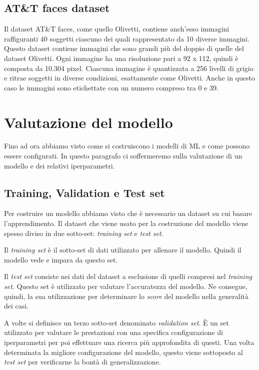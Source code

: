 \documentclass[12pt,italian]{report}
\begin{document}
\subsection{AT\&T faces dataset}
Il dataset AT\&T faces, come quello Olivetti, contiene anch'esso immagini raffiguranti 40 soggetti ciascuno dei quali rappresentato da 10 diverse immagini. Questo dataset contiene immagini che sono grandi più del doppio di quelle del dataset Olivetti. Ogni immagine ha una risoluzione pari a 92 x 112, quindi è composta da 10.304 pixel. Ciascuna immagine è quantizzata a 256 livelli di grigio e ritrae soggetti in diverse condizioni, esattamente come Olivetti. Anche in questo caso le immagini sono etichettate con un numero compreso tra 0 e 39.

\section{Valutazione del modello}
Fino ad ora abbiamo visto come si costruiscono i modelli di ML e come possono essere configurati. In questo paragrafo ci soffermeremo sulla valutazione di un modello e dei relativi iperparametri.

\subsection{Training, Validation e Test set}
Per costruire un modello abbiamo visto che è necessario un dataset su cui basare l'apprendimento. Il dataset che viene usato per la costruzione del modello viene spesso diviso in due sotto-set: \emph{training set} e \emph{test set}.

Il \emph{training set} è il sotto-set di dati utilizzato per allenare il modello. Quindi il modello vede e impara da questo set.

Il \emph{test set} consiste nei dati del dataset a esclusione di quelli compresi nel \emph{training set}. Questo set è utilizzato per valutare l'accuratezza del modello. 
Ne consegue, quindi, la sua utilizzazione per determinare lo \emph{score} del modello nella generalità dei casi.

A volte si definisce un terzo sotto-set denominato \emph{validation set}. È un set utilizzato per valutare le prestazioni con una specifica configurazione di iperparametri per poi effettuare una ricerca più approfondita di questi. 
Una volta determinata la migliore configurazione del modello, questo viene sottoposto al \emph{test set} per verificarne la bontà di generalizzazione.
\end{document}
